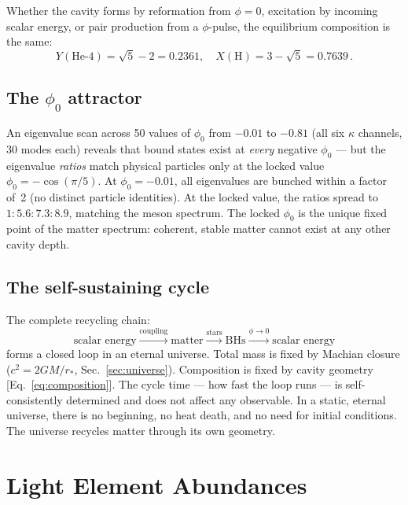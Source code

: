 \documentclass[aps,prd,twocolumn,superscriptaddress,nofootinbib,longbibliography]{revtex4-2}
\newcommand{\rstar}{r_{*}}
\newcommand{\phiz}{\phi_0}
\begin{document}
Whether the cavity forms by reformation from $\phi = 0$, excitation by
incoming scalar energy, or pair production from a $\phi$-pulse, the
equilibrium composition is the same:
\begin{equation}\label{eq:composition}
  Y(\text{He-4}) = \sqrt{5}-2 = 0.2361,\quad
  X(\text{H}) = 3-\sqrt{5} = 0.7639\,.
\end{equation}

\subsection{The $\phiz$ attractor}

An eigenvalue scan across 50 values of $\phiz$ from $-0.01$ to
$-0.81$ (all six $\kappa$ channels, 30 modes each) reveals that bound
states exist at \emph{every} negative $\phiz$ --- but the eigenvalue
\emph{ratios} match physical particles only at the locked value
$\phiz = -\cos(\pi/5)$.  At $\phiz = -0.01$, all eigenvalues are
bunched within a factor of~2 (no distinct particle identities).  At
the locked value, the ratios spread to $1:5.6:7.3:8.9$, matching the
meson spectrum.  The locked $\phiz$ is the unique fixed point of the
matter spectrum: coherent, stable matter cannot exist at any other
cavity depth.

\subsection{The self-sustaining cycle}

The complete recycling chain:
\begin{equation*}
  \text{scalar energy}
  \xrightarrow{\text{coupling}}
  \text{matter}
  \xrightarrow{\text{stars}}
  \text{BHs}
  \xrightarrow{\phi \to 0}
  \text{scalar energy}
\end{equation*}
forms a closed loop in an eternal universe.  Total mass is fixed by
Machian closure ($c^2 = 2GM/\rstar$, Sec.~\ref{sec:universe}).
Composition is fixed by cavity geometry [Eq.~\eqref{eq:composition}].
The cycle time --- how fast the loop runs --- is self-consistently
determined and does not affect any observable.  In a static, eternal
universe, there is no beginning, no heat death, and no need for
initial conditions.  The universe recycles matter through its own
geometry.

\section{Light Element Abundances}\label{sec:bbn}
\end{document}
